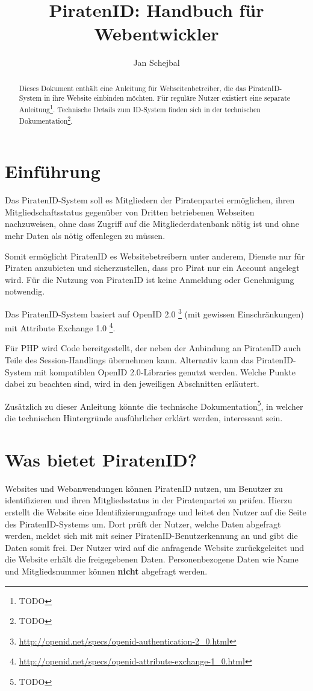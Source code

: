 \documentclass[parskip=half]{scrartcl}
\title{PiratenID: Handbuch für Webentwickler}
\author{Jan Schejbal}
\date{}
\begin{document}
\maketitle

\begin{abstract}\noindent
Dieses Dokument enthält eine Anleitung für Webseitenbetreiber, die das PiratenID-System in ihre Website einbinden möchten.
Für reguläre Nutzer existiert eine separate Anleitung\footnote{TODO}.
Technische Details zum ID-System finden sich in der technischen Dokumentation\footnote{TODO}.
\end{abstract}


\section{Einführung}
Das PiratenID-System soll es Mitgliedern der Piratenpartei ermöglichen, ihren Mitgliedschaftsstatus gegenüber von Dritten betriebenen Webseiten nachzuweisen,
ohne dass Zugriff auf die Mitgliederdatenbank nötig ist und ohne mehr Daten als nötig offenlegen zu müssen.

Somit ermöglicht PiratenID es Websitebetreibern unter anderem, Dienste nur für Piraten anzubieten und sicherzustellen, dass pro Pirat nur ein Account angelegt wird.
Für die Nutzung von PiratenID ist keine Anmeldung oder Genehmigung notwendig.

Das PiratenID-System basiert auf OpenID 2.0 \footnote{\url{http://openid.net/specs/openid-authentication-2_0.html}} (mit gewissen Einschränkungen)
mit Attribute Exchange 1.0 \footnote{\url{http://openid.net/specs/openid-attribute-exchange-1_0.html}}.

Für PHP wird Code bereitgestellt, der neben der Anbindung an PiratenID auch Teile des Session-Handlings übernehmen kann.
Alternativ kann das PiratenID-System mit kompatiblen OpenID 2.0-Libraries genutzt werden.
Welche Punkte dabei zu beachten sind, wird in den jeweiligen Abschnitten erläutert.

Zusätzlich zu dieser Anleitung könnte die technische Dokumentation\footnote{TODO},
in welcher die technischen Hintergründe ausführlicher erklärt werden, interessant sein.

\newpage
\section{Was bietet PiratenID?}
Websites und Webanwendungen können PiratenID nutzen, um Benutzer zu identifizieren und ihren Mitgliedsstatus in der Piratenpartei zu prüfen.
Hierzu erstellt die Website eine Identifizierunganfrage und leitet den Nutzer auf die Seite des PiratenID-Systems um.
Dort prüft der Nutzer, welche Daten abgefragt werden, meldet sich mit mit seiner PiratenID-Benutzerkennung an und gibt die Daten somit frei.
Der Nutzer wird auf die anfragende Website zurückgeleitet und die Website erhält die freigegebenen Daten.
Personenbezogene Daten wie Name und Mitgliedsnummer können \textbf{nicht} abgefragt werden.
\end{document}
